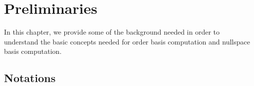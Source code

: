 
\chapter{Preliminaries}

\label{chap:Background}

In this chapter, we provide some of the background needed in order
to understand the basic concepts needed for order basis computation
and nullspace basis computation. %
\begin{comment}
, which provide lower bounds for the computational cost 
\end{comment}
{} %
\begin{comment}
The challenges of balancing input and handling unbalanced output are
discussed along with the techniques which we plan to use to overcome
the difficulties. We review the construction by \citet{Storjohann:2006}
which transforms the inputs to those having dimensions and degree
balance better suited for fast computation and discuss an idea from
\citet{storjohann-villard:2005} for handling the case where the output
degree is unbalanced.
\end{comment}



\section{Notations}

